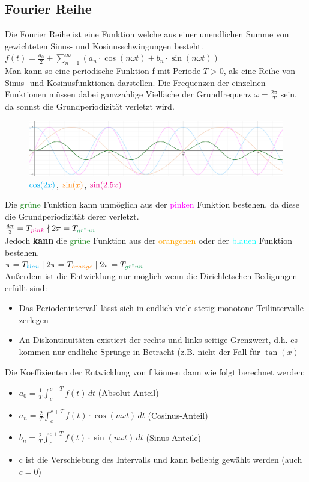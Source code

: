 \documentclass[12pt,a4paper]{article}
\newcommand{\green}[1]{\textcolor{ForestGreen} {#1}}
\newcommand{\magenta}[1]{\textcolor{magenta} {#1}}
\newcommand{\cyan}[1]{\textcolor{cyan} {#1}}
\newcommand{\orange}[1]{\textcolor{orange} {#1}}
\newcommand{\nl}{\\[0.1cm]}
\begin{document}
\subsection{Fourier Reihe}
Die Fourier Reihe ist eine Funktion welche aus einer unendlichen Summe von gewichteten Sinus- und Kosinusschwingungen besteht. $\displaystyle f(t) = \frac{a_0}{2} + \sum_{n=1}^\infty (a_n \cdot \cos (n\omega t) + b_n\cdot \sin(n\omega t))$\nl
Man kann so eine periodische Funktion f mit Periode $T>0$, als eine Reihe von Sinus- und Kosinusfunktionen darstellen. Die Frequenzen der einzelnen Funktionen müssen dabei ganzzahlige Vielfache der Grundfrequenz $\omega = \frac{2\pi}{T}$ sein, da sonnst die Grundperiodizität verletzt wird.
\begin{figure}[H]
\includegraphics[width=\textwidth]{./resources/grundperiode.png}
\caption{$\cyan{\cos(2x)}$, $\orange{\sin(x)}$, $\magenta{\sin(2.5x)}$}
\end{figure}
Die \green{grüne} Funktion kann unmöglich aus der \magenta{pinken} Funktion bestehen, da diese die Grundperiodizität derer verletzt.\\
$\frac{4\pi}{3} = T_{\magenta{pink}} \nmid 2\pi = T_{\green{gr"un}}$\nl
Jedoch \textbf{kann} die \green{grüne} Funktion aus der \orange{orangenen} oder der \cyan{blauen} Funktion bestehen.\\$\pi = T_{\cyan{blau}} \mid 2\pi = T_{\orange{orange}} \mid 2\pi = T_{\green{gr"un}}$\nl
Außerdem ist die Entwicklung nur möglich wenn die Dirichletschen Bedigungen erfüllt sind:
\begin{itemize}
\item Das Periodenintervall lässt sich in endlich viele stetig-monotone Teilintervalle zerlegen
\item An Diskontinuitäten existiert der rechts und links-seitige Grenzwert, d.h. es kommen nur endliche Sprünge in Betracht (z.B. nicht der Fall für $\tan(x)$
\end{itemize}
Die Koeffizienten der Entwicklung von f können dann wie folgt berechnet werden:\nl
\begin{itemize}
\item $\displaystyle a_0 = \frac{1}{T} \int_c^{c+T} f(t)\, dt$ (Absolut-Anteil)
\item $\displaystyle a_n = \frac{2}{T} \int_c^{c+T} f(t)\cdot \cos(n\omega t)\,dt$ (Cosinus-Anteil)
\item $\displaystyle b_n = \frac{2}{T} \int_c^{c+T} f(t)\cdot \sin(n\omega t)\,dt$ (Sinus-Anteile)
\item c ist die Verschiebung des Intervalls und kann beliebig gewählt werden (auch $c=0$)
\end{itemize}
\end{document}

